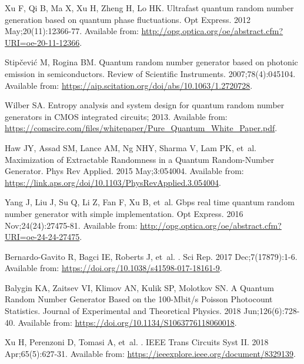 \documentclass[]{interact}
\theoremstyle{plain}%
\theoremstyle{definition}
\theoremstyle{remark}
\begin{document}
\begin{thebibliography}{100}
Xu F, Qi B, Ma X, Xu H, Zheng H, Lo HK.
\newblock Ultrafast quantum random number generation based on quantum phase
  fluctuations.
\newblock Opt Express. 2012 May;20(11):12366-77.
\newblock Available from:
  \url{http://opg.optica.org/oe/abstract.cfm?URI=oe-20-11-12366}.

Stipčević M, Rogina BM.
\newblock Quantum random number generator based on photonic emission in
  semiconductors.
\newblock Review of Scientific Instruments. 2007;78(4):045104.
\newblock Available from:
  \url{https://aip.scitation.org/doi/abs/10.1063/1.2720728}.

Wilber SA. Entropy analysis and system design for quantum random number
  generators in CMOS integrated circuits; 2013.
\newblock Available from:
  \url{https://comscire.com/files/whitepaper/Pure_Quantum_White_Paper.pdf}.

Haw JY, Assad SM, Lance AM, Ng NHY, Sharma V, Lam PK, et~al.
\newblock Maximization of Extractable Randomness in a Quantum Random-Number
  Generator.
\newblock Phys Rev Applied. 2015 May;3:054004.
\newblock Available from:
  \url{https://link.aps.org/doi/10.1103/PhysRevApplied.3.054004}.

Yang J, Liu J, Su Q, Li Z, Fan F, Xu B, et~al.
 Gbps real time quantum random number generator with simple
  implementation.
\newblock Opt Express. 2016 Nov;24(24):27475-81.
\newblock Available from:
  \url{http://opg.optica.org/oe/abstract.cfm?URI=oe-24-24-27475}.

Bernardo-Gavito R, Bagci IE, Roberts J, et~al.
.
\newblock Sci Rep. 2017 Dec;7(17879):1-6.
\newblock Available from: \url{https://doi.org/10.1038/s41598-017-18161-9}.

Balygin KA, Zaitsev VI, Klimov AN, Kulik SP, Molotkov SN.
\newblock A Quantum Random Number Generator Based on the 100-Mbit/s Poisson
  Photocount Statistics.
\newblock Journal of Experimental and Theoretical Physics. 2018
  Jun;126(6):728-40.
\newblock Available from: \url{https://doi.org/10.1134/S1063776118060018}.

Xu H, Perenzoni D, Tomasi A, et~al.
.
\newblock IEEE Trans Circuits Syst II. 2018 Apr;65(5):627-31.
\newblock Available from: \url{https://ieeexplore.ieee.org/document/8329139}.


\end{thebibliography}
\end{document}
